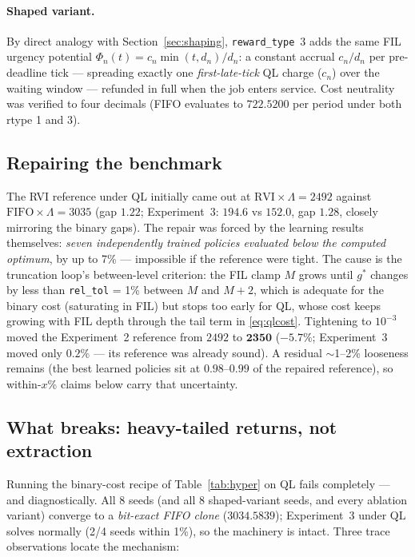 \documentclass[11pt,a4paper]{article}
\begin{document}
\paragraph{Shaped variant.}
By direct analogy with Section~\ref{sec:shaping}, \texttt{reward\_type}~3
adds the same FIL urgency potential
$\Phi_n(t) = c_n \min(t, d_n)/d_n$: a constant accrual $c_n/d_n$ per
pre-deadline tick --- spreading exactly one \emph{first-late-tick} QL
charge ($c_n$) over the waiting window --- refunded in full when the job
enters service.  Cost neutrality was verified to four decimals (FIFO
evaluates to $722.5200$ per period under both rtype 1 and 3).

\subsection{Repairing the benchmark}
\label{sec:qlrvi}

The RVI reference under QL initially came out at
$\mathrm{RVI}\times\Lambda = 2492$ against
$\mathrm{FIFO}\times\Lambda = 3035$ (gap $1.22$; Experiment~3: $194.6$ vs
$152.0$, gap $1.28$, closely mirroring the binary gaps).  The repair was
forced by the learning results themselves: \emph{seven independently
trained policies evaluated below the computed optimum}, by up to 7\% ---
impossible if the reference were tight.  The cause is the truncation
loop's between-level criterion: the FIL clamp $M$ grows until $g^*$
changes by less than \texttt{rel\_tol} = 1\% between $M$ and $M{+}2$,
which is adequate for the binary cost (saturating in FIL) but stops too
early for QL, whose cost keeps growing with FIL depth through the tail
term in \eqref{eq:qlcost}.  Tightening to $10^{-3}$ moved the
Experiment~2 reference from $2492$ to $\mathbf{2350}$ ($-5.7\%$;
Experiment~3 moved only $0.2\%$ --- its reference was already sound).
A residual $\sim$1--2\% looseness remains (the best learned policies sit
at $0.98$--$0.99$ of the repaired reference), so within-$x$\% claims
below carry that uncertainty.

\subsection{What breaks: heavy-tailed returns, not extraction}
\label{sec:qlfailure}

Running the binary-cost recipe of Table~\ref{tab:hyper} on QL fails
completely --- and diagnostically.  All 8 seeds (and all 8 shaped-variant
seeds, and every ablation variant) converge to a \emph{bit-exact FIFO
clone} ($3034.5839$); Experiment~3 under QL solves normally (2/4 seeds
within 1\%), so the machinery is intact.  Three trace observations locate
the mechanism:
\end{document}
